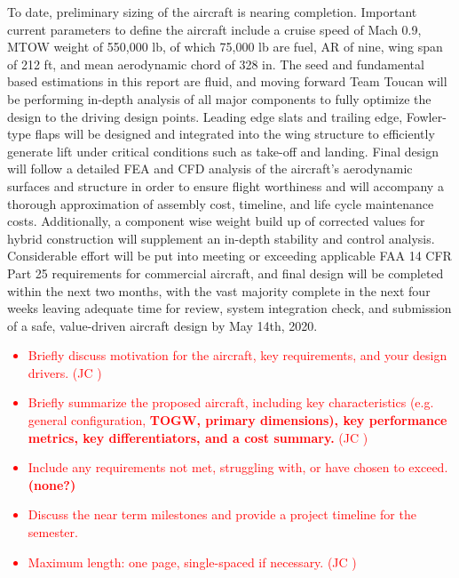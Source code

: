 To date, preliminary sizing of the aircraft is nearing completion.  Important current parameters to define the aircraft include a cruise speed of Mach 0.9, MTOW weight of 550,000 lb, of which 75,000 lb are fuel, AR of nine, wing span of 212 ft, and mean aerodynamic chord of 328 in. The seed and fundamental based estimations in this report are fluid, and moving forward Team Toucan will be performing in-depth analysis of all major components to fully optimize the design to the driving design points.  Leading edge slats and trailing edge,  Fowler-type flaps will be designed and integrated into the wing structure to efficiently generate lift under critical conditions such as take-off and landing.  Final design will follow a detailed FEA and CFD analysis of the aircraft's aerodynamic surfaces and structure in order to ensure flight worthiness and will accompany a thorough approximation of assembly cost, timeline, and life cycle maintenance costs.  Additionally, a component wise weight build up of corrected values for hybrid construction will supplement an in-depth stability and control analysis.  Considerable effort will be put into meeting or exceeding applicable FAA 14 CFR Part 25 requirements for commercial aircraft, and final design will be completed within the next two months, with the vast majority complete in the next four weeks leaving adequate time for review, system integration check, and submission of a safe, value-driven aircraft design by May 14th, 2020.

\textcolor{red}{
\begin{itemize}
    \item Briefly discuss motivation for the aircraft, key requirements, and your design drivers. (JC \checkmark)
    \item Briefly  summarize the proposed aircraft, including key  characteristics (e.g. general configuration, \textbf{TOGW, primary dimensions), key performance metrics, key differentiators, and a cost summary.} (JC \checkmark)
    \item Include any requirements not met, struggling with, or have chosen to exceed. \textbf{(none?)}
    \item Discuss the near term milestones and provide a project timeline for the semester. 
    \item Maximum length: one page, single-spaced if necessary. (JC \checkmark)
\end{itemize}}